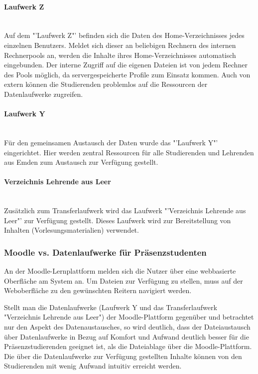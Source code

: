 \paragraph{Laufwerk Z}\mbox{} \\

Auf dem "'Laufwerk Z"' befinden sich die Daten des Home-Verzeichnisses jedes einzelnen Benutzers. Meldet sich dieser an beliebigen Rechnern des internen Rechnerpools an, werden die Inhalte ihres Home-Verzeichnisses automatisch eingebunden. Der interne Zugriff auf die eigenen Dateien ist von jedem Rechner des Pools möglich, da servergespeicherte Profile zum Einsatz kommen. Auch von extern können die Studierenden problemlos auf die Ressourcen der Datenlaufwerke zugreifen.

\paragraph{Laufwerk Y}\mbox{} \\

Für den gemeinsamen Austausch der Daten wurde das "'Laufwerk Y"' eingerichtet. Hier werden zentral Ressourcen für alle Studierenden und Lehrenden aus Emden zum Austausch zur Verfügung gestellt.

\paragraph{Verzeichnis Lehrende aus Leer}\mbox{} \\

Zusätzlich zum Transferlaufwerk wird das Laufwerk "'Verzeichnis Lehrende aus Leer"' zur Verfügung gestellt. Dieses Laufwerk wird zur Bereitstellung von Inhalten (Vorlesungsmaterialien) verwendet.

\subsubsection{Moodle vs. Datenlaufwerke für Präsenzstudenten}
An der Moodle-Lernplattform melden sich die Nutzer über eine webbasierte Oberfläche am System an. Um Dateien zur Verfügung zu stellen, muss auf der Weboberfläche zu den gewünschten Reitern navigiert werden.

Stellt man die Datenlaufwerke (Laufwerk Y und das Transferlaufwerk "Verzeichnis Lehrende aus Leer") der Moodle-Plattform gegenüber und betrachtet nur den Aspekt des Datenaustausches, so wird deutlich, dass der Dateiaustausch über Datenlaufwerke in Bezug auf Komfort und Aufwand deutlich besser für die Präsenzstudierenden geeignet ist, als die Dateiablage über die Moodle-Plattform. Die über die Datenlaufwerke zur Verfügung gestellten Inhalte können von den Studierenden mit wenig Aufwand intuitiv erreicht werden.

